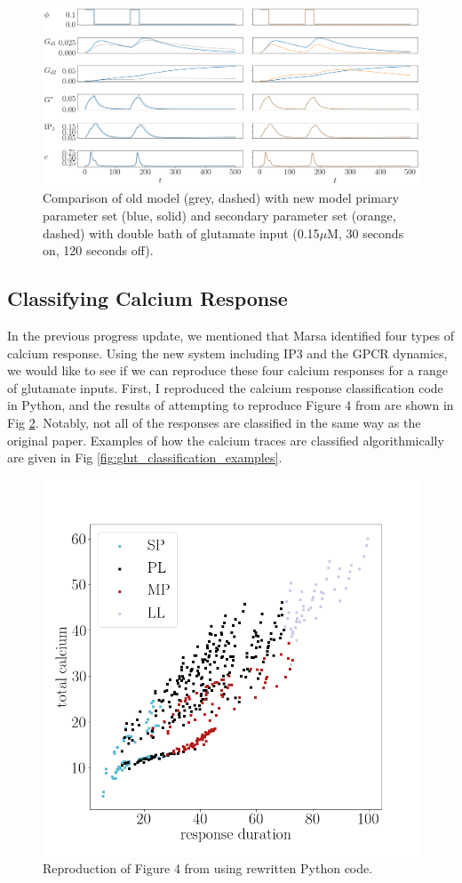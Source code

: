 \documentclass[12pt]{article}
\begin{document}
\begin{figure}[H]
	\includegraphics[width=1\linewidth]{figures/full_double_bath_comparison2.png}
	\centering
	\caption{Comparison of old model (grey, dashed) with new model primary parameter set (blue, solid) and secondary parameter set (orange, dashed) with double bath of glutamate input (0.15$\mu$M, 30 seconds on, 120 seconds off).}
	\label{fig:full_double_bath_comparison2}
\end{figure}


\subsection{Classifying Calcium Response}

In the previous progress update, we mentioned that Marsa identified four types of calcium response. Using the new system including IP3 and the GPCR dynamics, we would like to see if we can reproduce these four calcium responses for a range of glutamate inputs. First, I reproduced the calcium response classification code in Python, and the results of attempting to reproduce Figure 4 from \cite{taheri2017diversity} are shown in Fig \ref{fig:ip3_classification}. Notably, not all of the responses are classified in the same way as the original paper. Examples of how the calcium traces are classified algorithmically are given in Fig \ref{fig:glut_classification_examples}. 

\begin{figure}[H]
	\includegraphics[width=0.6\linewidth]{ip3_classification.png}
	\centering
	\caption{Reproduction of Figure 4 from \cite{taheri2017diversity} using rewritten Python code. }
	\label{fig:ip3_classification}
\end{figure}
\end{document}
